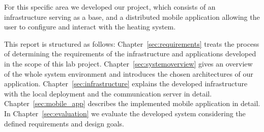 For this specific area we developed our project, which consists of an infrastructure serving as a base, and a distributed mobile application allowing the user to configure and interact with the heating system.

This report is structured as follows:
Chapter~\ref{sec:requirements} treats the process of determining the requirements of the infrastructure and applications developed in the scope of this lab project.
Chapter~\ref{sec:systemoverview} gives an overview of the whole system environment and introduces the chosen architectures of our application.
Chapter~\ref{sec:infrastructure} explains the developed infrastructure with the local deployment and the communication server in detail.
Chapter~\ref{sec:mobile_app} describes the implemented mobile application in detail.
In Chapter~\ref{sec:evaluation} we evaluate the developed system considering the defined requirements and design goals.

